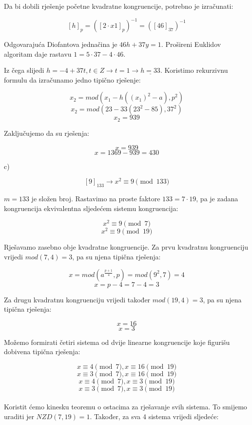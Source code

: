 \documentclass[12pt]{article}
\begin{document}
Da bi dobili rješenje početne kvadratne kongruencije, potrebno je izračunati:

$$[h]_{p} = ([2\cdot x1]_{p})^{-1} = ([46]_{37})^{-1}$$\vspace{1mm}

Odgovarajuća Diofantova jednačina je $46h + 37y = 1$. Prošireni Euklidov algoritam daje rastavu $1 = 5 \cdot 37 - 4 \cdot 46$.

Iz čega slijedi $h = -4 + 37t, t \in Z \to t = 1 \to \underline{h = 33}$. Koristimo rekurzivnu formulu da izračunamo jedno tipično rješenje:

$$x_{2} = mod(x_{1} - h((x_{1})^2 - a), p^2)$$
$$x_{2} = mod(23 - 33(23^2 - 85), 37^2)$$
$$x_{2} = 939$$\vspace{1mm}

Zaključujemo da su rješenja:

$$x = 939$$
$$x = 1369 - 939 = 430$$\vspace{1mm}

c)

$$[9]_{133} \to x^2\equiv 9 \pmod{133}$$\vspace{1mm}

$m = 133$ je složen broj. Rastavimo na proste faktore $133 = 7 \cdot 19$, pa je zadana kongruencija ekvivalentna sljedećem sistemu kongruencija:

$$x^2 \equiv 9 \pmod{7}$$
$$x^2 \equiv 9 \pmod{19}$$\vspace{1mm}

Rješavamo zasebno obje kvadratne kongruencije. Za prvu kvadratnu kongruenciju vrijedi $mod(7, 4) = 3$, pa su njena tipična rješenja:

$$x = mod(a^{\frac{p + 1}{4}}, p) = mod(9^2, 7) = 4$$
$$x = p - 4 = 7 - 4 = 3$$\vspace{1mm}

Za drugu kvadratnu kongruenciju vrijedi također $mod(19, 4) = 3$, pa su njena tipična rješenja:

$$x = 16$$
$$x = 3$$\vspace{1mm}

Možemo formirati četiri sistema od dvije linearne kongruencije koje figurišu dobivena tipična rješenja:

\[
x \equiv 4 \pmod{7}, x \equiv 16 \pmod{19} \label{eq:Z6eq1} \tag{1}
\]
\[
x \equiv 3 \pmod{7}, x \equiv 16 \pmod{19} \label{eq:Z6eq2} \tag{2}
\]
\[
x \equiv 4 \pmod{7}, x \equiv 3 \pmod{19} \label{eq:Z6eq3} \tag{3}
\]
\[
x \equiv 3 \pmod{7}, x \equiv 3 \pmod{19} \label{eq:Z6eq4} \tag{4}
\]
\\
Koristit ćemo kinesku teoremu o ostacima za rješavanje svih sistema. To smijemo uraditi jer $NZD(7, 19) = 1$. Također, za sva 4 sistema vrijedi sljedeće:
\end{document}
